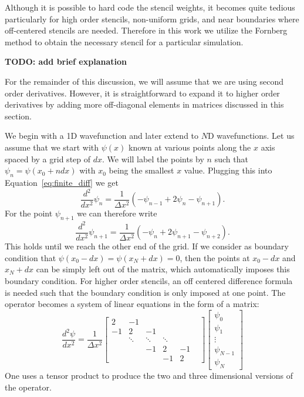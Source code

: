 Although it is possible to hard code the stencil weights, it becomes quite tedious particularly for high order stencils, non-uniform grids, and near boundaries where off-centered stencils are needed. Therefore in this work we utilize the Fornberg method \cite{Fornberg1988} to obtain the necessary stencil for a particular simulation. 

\textbf{TODO: add brief explanation }

For the remainder of this discussion, we will assume that we are using second order derivatives. However, it is straightforward to expand it to higher order derivatives by adding more off-diagonal elements in matrices discussed in this section. 

We begin with a 1D wavefunction and later extend to $N$D wavefunctions. Let us assume that we start with $\psi(x)$ known at various points along the $x$ axis spaced by a grid step of $dx$. We will label the points by $n$ such that $\psi_n = \psi(x_0 + n dx)$ with $x_0$ being the smallest $x$ value. Plugging this into Equation~\ref{eq:finite_diff} we get
\begin{equation}
    \frac{d^2}{dx^2}\psi_n = \frac{1}{\Delta x^2}\left(-\psi_{n-1}+2\psi_n-\psi_{n+1} \right).
    \label{eq:finite_diff_second_order}
\end{equation}
For the point $\psi_{n+1}$ we can therefore write
\begin{equation}
    \frac{d^2}{dx^2}\psi_{n+1} = \frac{1}{\Delta x^2}\left(-\psi_{n}+2\psi_{n+1}-\psi_{n+2} \right).
    \label{eq:finite_diff_second_order_n+1}
\end{equation}
This holds until we reach the other end of the grid. If we consider as boundary condition that $\psi(x_0-dx)=\psi(x_N+dx)=0$, then the points at $x_0-dx$ and $x_N+dx$ can be simply left out of the matrix, which automatically imposes this boundary condition. For higher order stencils, an off centered difference formula is needed such that the boundary condition is only imposed at one point. The operator becomes a system of linear equations in the form of a matrix:
\begin{equation}
\frac{d^2\psi}{dx^2} =
\frac{1}{\Delta x^2}
\begin{bmatrix}
    2 & -1 &  &  &   &  \\
    -1 & 2 & -1 &  &  &  \\
     & \ddots & \ddots & \ddots & \\
     &  & -1 & 2 & -1\\
     &   &  & -1 & 2
\end{bmatrix}
\begin{bmatrix}
    \psi_{0} \\
    \psi_{1} \\
    \vdots  \\
    \psi_{N-1}  \\
    \psi_{N}
\end{bmatrix}
\end{equation}
One uses a tensor product to produce the two and three dimensional versions of the operator.

